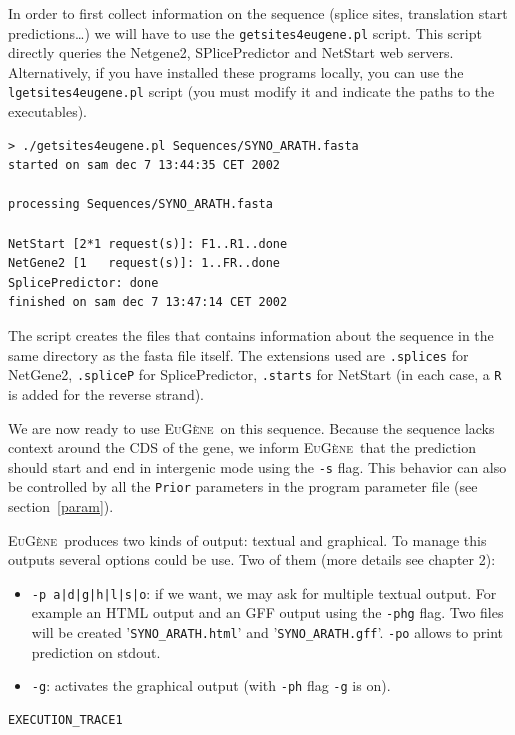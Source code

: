\documentclass[a4paper,titlepage]{report}
\newcommand{\EuGene}{\textsc{EuG\`ene}}
\begin{document}
In order to first collect information on the sequence (splice sites,
translation start predictions\ldots) we will have to use the
\texttt{getsites4eugene.pl} script. This script directly queries the
Netgene2, SPlicePredictor and NetStart web servers. Alternatively, if
you have installed these programs locally, you can use the
\texttt{lgetsites4eugene.pl} script (you must modify it and indicate
the paths to the executables). 

\begin{Verbatim}[fontsize=\scriptsize]
> ./getsites4eugene.pl Sequences/SYNO_ARATH.fasta 
started on sam dec 7 13:44:35 CET 2002

processing Sequences/SYNO_ARATH.fasta

NetStart [2*1 request(s)]: F1..R1..done
NetGene2 [1   request(s)]: 1..FR..done
SplicePredictor: done
finished on sam dec 7 13:47:14 CET 2002
\end{Verbatim}

The script creates the files that contains information about the
sequence in the same directory as the fasta file itself. The
extensions used are \texttt{.splices} for NetGene2, \texttt{.spliceP}
for SplicePredictor, \texttt{.starts} for NetStart (in each case, a
\texttt{R} is added for the reverse strand). 

We are now ready to use \EuGene\ on this sequence. Because the
sequence lacks context around the CDS of the gene, we inform \EuGene\ 
that the prediction should start and end in intergenic mode using the
\texttt{-s} flag. This behavior can also be controlled by all the
\texttt{Prior} parameters in the program parameter file (see
section~\ref{param}).

\EuGene\ produces two kinds of output: textual and graphical. To manage this outputs
several options could be use. Two of them (more details see chapter 2):
\begin{itemize}
\item \texttt{-p a|d|g|h|l|s|o}: if we want, we may ask for multiple textual output. For example an HTML output
and an GFF output using the \texttt{-phg} flag. Two files will be created '\texttt{SYNO\_ARATH.html}'
and '\texttt{SYNO\_ARATH.gff}'. \texttt{-po} allows to print prediction on stdout.
\item \texttt{-g}: activates the graphical output (with \texttt{-ph} flag \texttt{-g} is on).\\
\end{itemize}

\begin{Verbatim}[fontsize=\scriptsize]
EXECUTION_TRACE1
\end{Verbatim}
\end{document}
